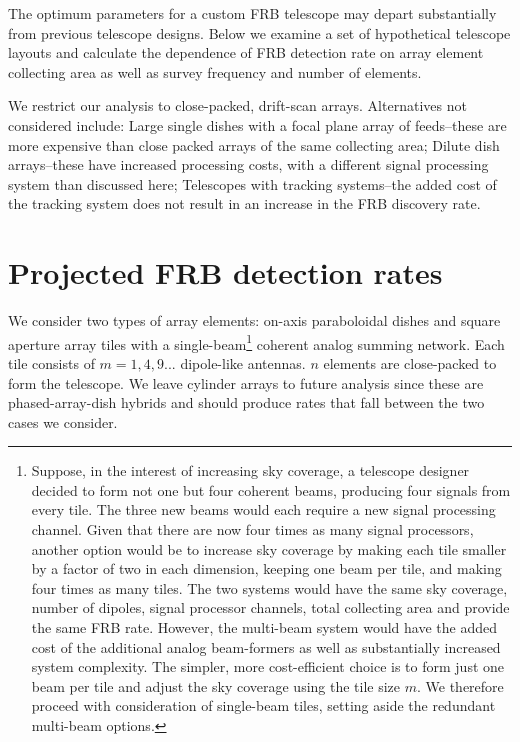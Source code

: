 \documentclass[fleqn,usenatbib]{mnras}
\begin{document}
The optimum parameters for a custom FRB telescope may depart substantially from previous telescope designs.  Below we examine a set of hypothetical telescope layouts and calculate the dependence of FRB detection rate on array element collecting area as well as survey frequency and number of elements.

We restrict our analysis to close-packed, drift-scan arrays. Alternatives not considered include: Large single dishes with a focal plane array of feeds--these are more expensive than close packed arrays of the same collecting area; Dilute dish arrays--these have increased processing costs, with a different signal processing system than discussed here; Telescopes with tracking systems--the added cost of the tracking system does not result in an increase in the FRB discovery rate.

\section{Projected FRB detection rates}

We consider two types of array elements: on-axis paraboloidal dishes and square aperture array tiles with a single-beam\footnote{Suppose, in the interest of increasing sky coverage, a telescope designer decided to form not one but four coherent beams, producing four signals from every tile. The three new beams would each require a new signal processing channel. Given that there are now four times as many signal processors, another option would be to increase sky coverage by making each tile smaller by a factor of two in each dimension, keeping one beam per tile, and making four times as many tiles. The two systems would have the same sky coverage, number of dipoles, signal processor channels, total collecting area and provide the same FRB rate. However, the multi-beam system would have the added cost of the additional analog beam-formers as well as substantially increased system complexity. The simpler, more cost-efficient choice is to form just one beam per tile and adjust the sky coverage using the tile size $m$. We therefore proceed with consideration of single-beam tiles, setting aside the redundant multi-beam options.} coherent analog summing network. Each tile consists of $m=1, 4, 9 ...$ dipole-like antennas. $n$ elements are close-packed to form the telescope.
We leave cylinder arrays \citep{chimesystem} to future analysis since these are phased-array-dish hybrids and should produce rates that fall between the two cases we consider.
\end{document}

